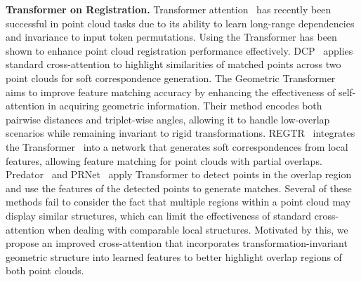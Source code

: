 \noindent\textbf{Transformer on Registration.}
Transformer attention~\cite{vaswani2017attention} has recently been successful in point cloud tasks due to its ability to learn long-range dependencies and invariance to input token permutations.
Using the Transformer has been shown to enhance point cloud registration performance effectively.
DCP~\cite{wang2019deep} applies standard cross-attention to highlight similarities of matched points across two point clouds for soft correspondence generation.
The Geometric Transformer~\cite{qin2022geometric} aims to improve feature matching accuracy by enhancing the effectiveness of self-attention in acquiring geometric information.
Their method encodes both pairwise distances and triplet-wise angles, allowing it to handle low-overlap scenarios while remaining invariant to rigid transformations.
REGTR~\cite{yew2022regtr} integrates the Transformer~\cite{vaswani2017attention} into a network that generates soft correspondences from local features, allowing feature matching for point clouds with partial overlaps.
Predator~\cite{huang2021predator} and PRNet~\cite{wang2019prnet} apply Transformer to detect points in the overlap region and use the features of the detected points to generate matches.
Several of these methods fail to consider the fact that multiple regions within a point cloud may display similar structures, which can limit the effectiveness of standard cross-attention when dealing with comparable local structures.
Motivated by this, we propose an improved cross-attention that incorporates transformation-invariant geometric structure into learned features to better highlight overlap regions of both point clouds.